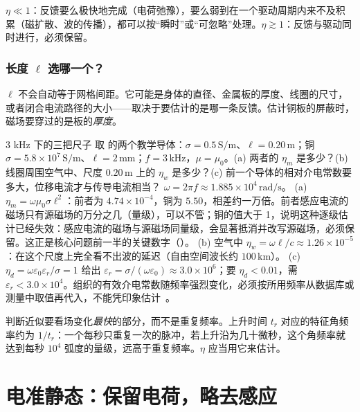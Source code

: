 \begin{intuition}
$\eta\ll1$：反馈要么极快地完成（电荷弛豫），要么弱到在一个驱动周期内来不及积累（磁扩散、波的传播），都可以按“瞬时”或“可忽略”处理。$\eta\gtrsim1$：反馈与驱动同时进行，必须保留。
\end{intuition}

\subsubsection{长度 $\ell$ 选哪一个？} $\ell$ 不会自动等于网格间距。它可能是身体的直径、金属板的厚度、线圈的尺寸，或者闭合电流路径的大小——取决于要估计的是哪一条反馈。估计铜板的屏蔽时，磁场要穿过的是板的\emph{厚度}。

\begin{example}{3 kHz 下的三把尺子}\label{ex:regimes-scales}
取 的两个教学导体：$\sigma=0.5\,\mathrm{S/m}$、$\ell=0.20\,\mathrm m$；铜 $\sigma=5.8\times10^7\,\mathrm{S/m}$、$\ell=2\,\mathrm{mm}$；$f=3\,\mathrm{kHz}$，$\mu=\mu_0$。(a) 两者的 $\eta_m$ 是多少？(b) 线圈周围空气中、尺度 $0.20\,\mathrm m$ 上的 $\eta_w$ 是多少？(c) 前一个导体的相对介电常数要多大，位移电流才与传导电流相当？
\solution
$\omega=2\pi f\approx1.885\times10^4\,\mathrm{rad/s}$。
(a) $\eta_m=\omega\mu_0\sigma\ell^2$：前者为 $4.74\times10^{-4}$，铜为 $5.50$，相差约一万倍。前者感应电流的磁场只有源磁场的万分之几（量级），可以不管；铜的值大于 1，说明这种逐级估计已经失效：感应电流的磁场与源磁场同量级，会显著抵消并改写源磁场，必须保留。这正是核心问题前一半的关键数字（）。
(b) 空气中 $\eta_w=\omega\ell/c\approx1.26\times10^{-5}$：在这个尺度上完全看不出波的延迟（自由空间波长约 $100\,\mathrm{km}$）。
(c) $\eta_d=\omega\varepsilon_0\varepsilon_r/\sigma=1$ 给出 $\varepsilon_r=\sigma/(\omega\varepsilon_0)\approx3.0\times10^6$；要 $\eta_d<0.01$，需 $\varepsilon_r<3.0\times10^4$。组织的有效介电常数随频率强烈变化，必须按所用频率从数据库或测量中取值再代入，不能凭印象估计~\cite{itisdielectric}。
\end{example}

\begin{pitfall}
判断近似要看场变化\emph{最快}的部分，而不是重复频率。上升时间 $t_r$ 对应的特征角频率约为 $1/t_r$：一个每秒只重复一次的脉冲，若上升沿为几十微秒，这个角频率就达到每秒 $10^4$ 弧度的量级，远高于重复频率。$\eta$ 应当用它来估计。
\end{pitfall}

\section{电准静态：保留电荷，略去感应}\label{sec:regimes-eqs}

